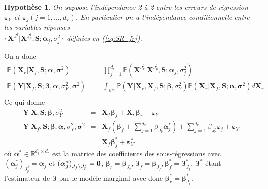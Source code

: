 \documentclass[12pt,a4paper]{report}
\newtheorem{hypfr}{Hypothèse}
\begin{document}
\begin{hypfr}\label{H3fr}
On suppose l'indépendance 2 à 2 entre les erreurs de régression $\boldsymbol{\varepsilon}_Y$ et $\boldsymbol{\varepsilon}_j (j=1,\dots,d_r)$. En particulier on a l'indépendance conditionnelle entre les variables réponses \\$\{\boldsymbol{X}^{J_r^j}|\boldsymbol{X}^{J_p^j},\boldsymbol{S};\boldsymbol{\alpha}_j,\sigma_j^2\}$ définies en (\ref{eq:SR_fr}).
\end{hypfr}
On a donc 
\begin{eqnarray}
		\mathbb{P}(\boldsymbol{X}_r|\boldsymbol{X}_f,\boldsymbol{S};\boldsymbol{\alpha},\boldsymbol{\sigma}^2)&=&\prod_{j=1}^{d_r}\mathbb{P}(\boldsymbol{X}^{J_r^j}|\boldsymbol{X}^{J_p^j},\boldsymbol{S};\boldsymbol{\alpha}_j,\sigma^2_j)	\\
		\mathbb{P}(\boldsymbol{Y}|\boldsymbol{X}_{f},\boldsymbol{S};\boldsymbol{\beta},\boldsymbol{\alpha},\sigma^2_Y ,\boldsymbol{\sigma}^2)&=& \int_{\mathbb{R}^{d_r}}\mathbb{P}(\boldsymbol{Y}|\boldsymbol{X}_{r},\boldsymbol{X}_{f},\boldsymbol{S};\boldsymbol{\beta},\sigma_Y^2)\mathbb{P}(\boldsymbol{X}_r|\boldsymbol{X}_f,\boldsymbol{S};\boldsymbol{\alpha},\boldsymbol{\sigma}^2) d \boldsymbol{X}_{r} \textrm{ \ \ \ \ }\\
		\end{eqnarray}
		Ce qui donne
		\begin{eqnarray}
		\boldsymbol{Y}|\boldsymbol{X},\boldsymbol{S};\boldsymbol{\beta},\sigma_Y^2 &=& \boldsymbol{X}_f\boldsymbol{\beta}_f+\boldsymbol{X}_r\boldsymbol{\beta}_r+\boldsymbol{\varepsilon}_Y\\
	\boldsymbol{Y}|\boldsymbol{X}_{f},\boldsymbol{S};\boldsymbol{\beta},\boldsymbol{\alpha},\sigma^2_Y,\boldsymbol{\sigma}^2&=&\boldsymbol{X}_{f} (\boldsymbol{\beta}_{f}+ \sum_{j =1}^{d_r}\beta_{J_r^j}\boldsymbol{\alpha}^*_j)+  \sum_{j =1}^{d_r}\beta_{J_r^j}\boldsymbol{\varepsilon}_j+\boldsymbol{\varepsilon}_Y  \label{marginalfr} \\
	&=&\boldsymbol{X}_{f}\boldsymbol{\beta}_{f}^*+\boldsymbol{\varepsilon}_Y^*
\end{eqnarray}
où $\boldsymbol{\alpha}^* \in \mathbb{R}^{d_f\times d_r}$ est la matrice des coefficients des sous-régressions avec $(\boldsymbol{\alpha}_j^*)_{J_p^j}=\boldsymbol{\alpha}_j $ et $(\boldsymbol{\alpha}_j^*)_{J_f\setminus J_p^j}=\bf 0  $, $\boldsymbol{\beta}_r=\boldsymbol{\beta}_{J_r}, \boldsymbol{\beta}_f=\boldsymbol{\beta}_{J_f}, \boldsymbol{\beta}_f^*=\boldsymbol{\beta}^*_{J_f} $, $\boldsymbol{\beta}^*$ étant l'estimateur de $\boldsymbol{\beta}$ par le modèle marginal avec donc $\boldsymbol{\beta}_r^*=\boldsymbol{\beta}^*_{J_r}$.
\\
\end{document}

